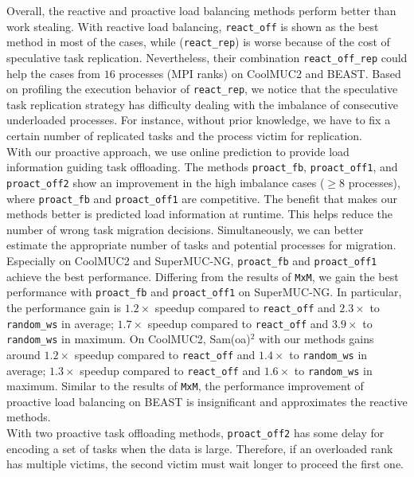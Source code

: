 Overall, the reactive and proactive load balancing methods perform better than work stealing. With reactive load balancing, \texttt{react\_off} is shown as the best method in most of the cases, while (\texttt{react\_rep}) is worse because of the cost of speculative task replication. Nevertheless, their combination \texttt{react\_off\_rep} could help the cases from $16$ processes (MPI ranks) on CoolMUC2 and BEAST. Based on profiling the execution behavior of \texttt{react\_rep}, we notice that the speculative task replication strategy has difficulty dealing with the imbalance of consecutive underloaded processes. For instance, without prior knowledge, we have to fix a certain number of replicated tasks and the process victim for replication.\\

With our proactive approach, we use online prediction to provide load information guiding task offloading. The methods \texttt{proact\_fb}, \texttt{proact\_off1}, and \texttt{proact\_off2} show an improvement in the high imbalance cases ($\geq 8$ processes), where \texttt{proact\_fb} and \texttt{proact\_off1} are competitive. The benefit that makes our methods better is predicted load information at runtime. This helps reduce the number of wrong task migration decisions. Simultaneously, we can better estimate the appropriate number of tasks and potential processes for migration.\\

Especially on CoolMUC2 and SuperMUC-NG, \texttt{proact\_fb} and \texttt{proact\_off1} achieve the best performance. Differing from the results of \texttt{MxM}, we gain the best performance with \texttt{proact\_fb} and \texttt{proact\_off1} on SuperMUC-NG. In particular, the performance gain is $1.2\times$ speedup compared to \texttt{react\_off} and $2.3\times$ to \texttt{random\_ws} in average; $1.7\times$ speedup compared to \texttt{react\_off} and $3.9\times$ to \texttt{random\_ws} in maximum. On CoolMUC2, Sam(oa)$^2$ with our methods gains around $1.2\times$ speedup compared to \texttt{react\_off} and $1.4\times$ to \texttt{random\_ws} in average; $1.3\times$ speedup compared to \texttt{react\_off} and $1.6\times$ to \texttt{random\_ws} in maximum. Similar to the results of \texttt{MxM}, the performance improvement of proactive load balancing on BEAST is insignificant and approximates the reactive methods.\\

With two proactive task offloading methods, \texttt{proact\_off2} has some delay for encoding a set of tasks when the data is large. Therefore, if an overloaded rank has multiple victims, the second victim must wait longer to proceed the first one.\\

